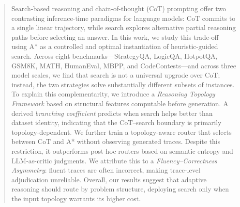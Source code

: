 \documentclass[11pt]{article}
\begin{document}



\begin{abstract}
Search-based reasoning and chain-of-thought (CoT) prompting offer two contrasting inference-time paradigms for language models: CoT commits to a single linear trajectory, while search explores alternative partial reasoning paths before selecting an answer. In this work, we study this trade-off using A* as a controlled and optimal instantiation of heuristic-guided search. Across eight benchmarks---StrategyQA, LogicQA, HotpotQA, GSM8K, MATH, HumanEval, MBPP, and CodeContests---and across three model scales, we find that search is not a universal upgrade over CoT; instead, the two strategies solve substantially different subsets of instances. To explain this complementarity, we introduce a \emph{Reasoning Topology Framework} based on structural features computable before generation. A derived \emph{branching coefficient} predicts when search helps better than dataset identity, indicating that the CoT--search boundary is primarily topology-dependent. We further train a topology-aware router that selects between CoT and A* without observing generated traces. Despite this restriction, it outperforms post-hoc routers based on semantic entropy and LLM-as-critic judgments. We attribute this to a \emph{Fluency--Correctness Asymmetry}: fluent traces are often incorrect, making trace-level adjudication unreliable. Overall, our results suggest that adaptive reasoning should route by problem structure, deploying search only when the input topology warrants its higher cost.
\end{abstract}
\end{document}
